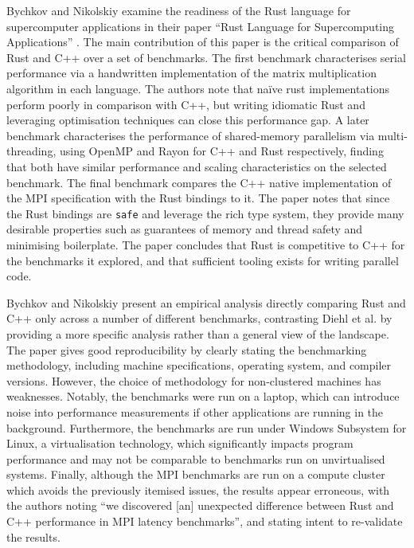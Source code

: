 Bychkov and Nikolskiy examine the readiness of the Rust language for supercomputer applications in their paper ``Rust Language for Supercomputing Applications'' \cite{bychkovRustLanguageSupercomputing2021}. The main contribution of this paper is the critical comparison of Rust and C++ over a set of benchmarks. The first benchmark characterises serial performance via a handwritten implementation of the matrix multiplication algorithm in each language. The authors note that na\"ive rust implementations perform poorly in comparison with C++, but writing idiomatic Rust and leveraging optimisation techniques can close this performance gap. A later benchmark characterises the performance of shared-memory parallelism via multi-threading, using OpenMP and Rayon for C++ and Rust respectively, finding that both have similar performance and scaling characteristics on the selected benchmark. The final benchmark compares the C++ native implementation of the MPI specification with the Rust bindings to it. The paper notes that since the Rust bindings are \texttt{safe} and leverage the rich type system, they provide many desirable properties such as guarantees of memory and thread safety and minimising boilerplate. The paper concludes that Rust is competitive to C++ for the benchmarks it explored, and that sufficient tooling exists for writing parallel code.

Bychkov and Nikolskiy present an empirical analysis directly comparing Rust and C++ only across a number of different benchmarks, contrasting Diehl et al. by providing a more specific analysis rather than a general view of the landscape. The paper gives good reproducibility by clearly stating the benchmarking methodology, including machine specifications, operating system, and compiler versions. However, the choice of methodology for non-clustered machines has weaknesses. Notably, the benchmarks were run on a laptop, which can introduce noise into performance measurements if other applications are running in the background. Furthermore, the benchmarks are run under Windows Subsystem for Linux, a virtualisation technology, which significantly impacts program performance and may not be comparable to benchmarks run on unvirtualised systems. Finally, although the MPI benchmarks are run on a compute cluster which avoids the previously itemised issues, the results appear erroneous, with the authors noting ``we discovered [an] unexpected difference between Rust and C++ performance in MPI latency benchmarks'', and stating intent to re-validate the results.



